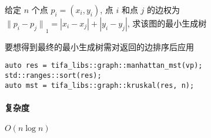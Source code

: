 给定 \(n\) 个点 \(p_i=(x_i,y_i)\), 点 \(i\) 和点 \(j\) 的边权为 \({\lVert p_i-p_j\rVert}_1=|x_i-x_j|+|y_i-y_j|\), 求该图的最小生成树

要想得到最终的最小生成树需对返回的边排序后应用 

\begin{verbatim}
auto res = tifa_libs::graph::manhattan_mst(vp);
std::ranges::sort(res);
auto mst = tifa_libs::graph::kruskal(res, n);  
\end{verbatim}

\paragraph{复杂度}

\(O(n\log n)\)

